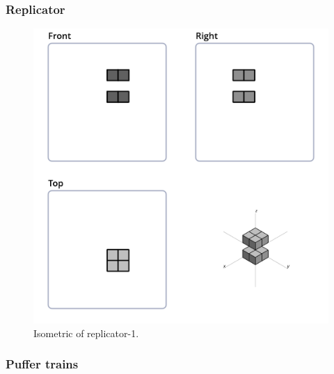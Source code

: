 \subsubsection{Replicator}
\begin{figure}
	\centering
	\includegraphics[scale=0.4]{iso_settings/puffer_1.png}
	\caption{Isometric of replicator-1.}
  \label{fig:iso-puffer-1}
\end{figure}

\subsubsection{Puffer trains}

